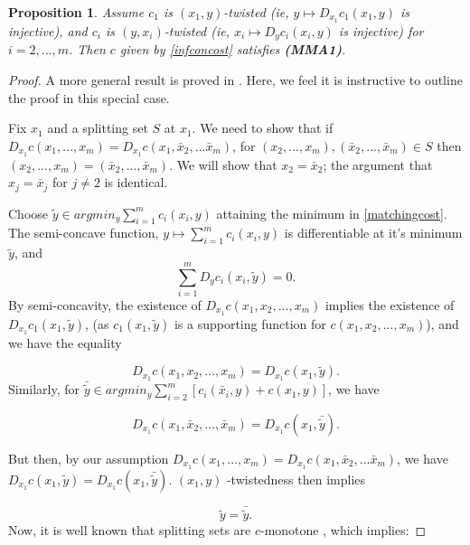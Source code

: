 \documentclass[letter,10pt]{article}
\theoremstyle{dotless}
\begin{document}
\newtheorem{infcosttwist}[radial]{Proposition}
\begin{infcosttwist}\label{infcosttwist}
Assume $c_1$ is $(x_1,y)$-twisted  (ie, $y \mapsto D_{x_1}c_1(x_1,y)$ is injective), and $c_i$ is $(y,x_i)$-twisted  (ie, $x_i \mapsto D_{y}c_i(x_i,y)$ is injective) for $i=2,...,m$.  Then $c$ given by \eqref{infconcost} satisfies \textbf{(MMA1)}.
\end{infcosttwist}
\begin{proof}
A more general result is proved in \cite{KP2}.  Here, we feel it is instructive to outline the proof in this special case.


Fix $x_1$ and a splitting set $S$ at $x_1$.  We need to show that if $D_{x_1}c(x_1,...,x_m) = D_{x_1}c(x_1,\bar x_2,...\bar x_m)$, for $(x_2,...,x_m), (\bar x_2,...,\bar x_m) \in S$ then $(x_2,...,x_m)= (\bar x_2,...,\bar x_m) $.  We will show that $x_2=\bar x_2$; the argument that $x_j=\bar x_j$ for $j \neq 2$ is identical.

Choose $\tilde y \in argmin_y \sum_{i=1}^m c_i(x_i,y)$  attaining the minimum in  \eqref{matchingcost}.  The semi-concave function, $ y \mapsto \sum_{i=1}^m c_i(x_i,y)$ is differentiable at it's minimum $\tilde y$, and 
\begin{equation}\label{firstordcond}
\sum_{i=1}^m D_yc_i(x_i,\tilde y)=0.
\end{equation}
By semi-concavity, the existence of $D_{x_1}c(x_1,x_2,...,x_m)$ implies the existence of $D_{x_1}c_1(x_1,\tilde y)$, (as $c_1(x_1,\tilde y)$ is a supporting function for $c(x_1,x_2,...,x_m)$), and we have the equality 

\begin{equation*}
D_{x_1}c(x_1,x_2,...,x_m)=D_{x_1}c(x_1,\tilde y).
\end{equation*}
Similarly, for $\bar{\tilde y} \in argmin_y \sum_{i=2}^m [c_i(\bar x_i,y) +c(x_1,y)]$, we have 


\begin{equation*}
D_{x_1}c(x_1,\bar x_2,...,\bar x_m)=D_{x_1}c(x_1,\bar{\tilde y}).
\end{equation*}

But then, by our assumption  $D_{x_1}c(x_1,...,x_m) = D_{x_1}c(x_1,\bar x_2,...\bar x_m)$, we have $D_{x_1}c(x_1,\tilde y)=D_{x_1}c(x_1,\bar{\tilde y}) $.  $(x_1,y)$ -twistedness then implies 

\begin{equation}\label{samebc}
\tilde y= \bar{\tilde y}.
\end{equation}
Now, it is well known that splitting sets are $c$-monotone \cite{KP2}, which implies:


\end{proof}
\end{document}
